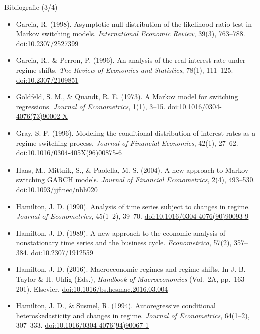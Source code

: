 \begin{frame}{Bibliografie (3/4)}
\itemsize{\tiny}
\begin{itemize}
    \item Garcia, R. (1998). Asymptotic null distribution of the likelihood ratio test in Markov switching models. \textit{International Economic Review}, 39(3), 763--788. \href{https://doi.org/10.2307/2527399}{doi:10.2307/2527399}
    \item Garcia, R., \& Perron, P. (1996). An analysis of the real interest rate under regime shifts. \textit{The Review of Economics and Statistics}, 78(1), 111--125. \href{https://doi.org/10.2307/2109851}{doi:10.2307/2109851}
    \item Goldfeld, S. M., \& Quandt, R. E. (1973). A Markov model for switching regressions. \textit{Journal of Econometrics}, 1(1), 3--15. \href{https://doi.org/10.1016/0304-4076(73)90002-X}{doi:10.1016/0304-4076(73)90002-X}
    \item Gray, S. F. (1996). Modeling the conditional distribution of interest rates as a regime-switching process. \textit{Journal of Financial Economics}, 42(1), 27--62. \href{https://doi.org/10.1016/0304-405X(96)00875-6}{doi:10.1016/0304-405X(96)00875-6}
    \item Haas, M., Mittnik, S., \& Paolella, M. S. (2004). A new approach to Markov-switching GARCH models. \textit{Journal of Financial Econometrics}, 2(4), 493--530. \href{https://doi.org/10.1093/jjfinec/nbh020}{doi:10.1093/jjfinec/nbh020}
    \item Hamilton, J. D. (1990). Analysis of time series subject to changes in regime. \textit{Journal of Econometrics}, 45(1--2), 39--70. \href{https://doi.org/10.1016/0304-4076(90)90093-9}{doi:10.1016/0304-4076(90)90093-9}
    \item Hamilton, J. D. (1989). A new approach to the economic analysis of nonstationary time series and the business cycle. \textit{Econometrica}, 57(2), 357--384. \href{https://doi.org/10.2307/1912559}{doi:10.2307/1912559}
    \item Hamilton, J. D. (2016). Macroeconomic regimes and regime shifts. In J. B. Taylor \& H. Uhlig (Eds.), \textit{Handbook of Macroeconomics} (Vol.\ 2A, pp.\ 163--201). Elsevier. \href{https://doi.org/10.1016/bs.hesmac.2016.03.004}{doi:10.1016/bs.hesmac.2016.03.004}
    \item Hamilton, J. D., \& Susmel, R. (1994). Autoregressive conditional heteroskedasticity and changes in regime. \textit{Journal of Econometrics}, 64(1--2), 307--333. \href{https://doi.org/10.1016/0304-4076(94)90067-1}{doi:10.1016/0304-4076(94)90067-1}

\end{itemize}
\end{frame}
